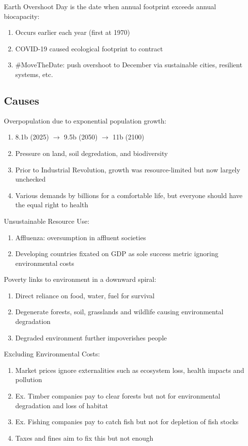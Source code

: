 \documentclass[12pt, a4paper]{article}
\begin{document}
\begin{multicols*}{3}
Earth Overshoot Day is the date when annual footprint exceeds annual biocapacity:
\begin{enumerate}[\roman*.]
  \item Occurs earlier each year (first at 1970)
  \item COVID-19 caused ecological footprint to contract
  \item \#MoveTheDate: push overshoot to December via sustainable cities, resilient systems, etc.
\end{enumerate}
\vspace{-1em}
\colbreak
\subsection{Causes}
Overpopulation due to exponential population growth:
\begin{enumerate}[\roman*.]
  \item 8.1b (2025) $\rightarrow$ 9.5b (2050) $\rightarrow$ 11b (2100) 
  \item Pressure on land, soil degredation, and biodiversity 
  \item Prior to Industrial Revolution, growth was resource-limited but now largely unchecked 
  \item Various demands by billions for a comfortable life, but everyone should have the equal right to health 
\end{enumerate}

Unsustainable Resource Use:
\begin{enumerate}[\roman*.]
  \item Affluenza: oversumption in affluent societies
  \item Developing countries fixated on GDP as sole success metric ignoring environmental costs
\end{enumerate}

Poverty links to environment in a downward spiral:
\begin{enumerate}[\roman*.]
  \item Direct reliance on food, water, fuel for survival
  \item Degenerate forests, soil, grasslands and wildlife causing environmental degradation
  \item Degraded environment further impoverishes people
\end{enumerate}

Excluding Environmental Costs:
\begin{enumerate}[\roman*.]
  \item Market prices ignore externalities such as ecosystem loss, health impacts and pollution 
  \item Ex. Timber companies pay to clear forests but not for environmental degradation and loss of habitat 
  \item Ex. Fishing companies pay to catch fish but not for depletion of fish stocks 
  \item Taxes and fines aim to fix this but not enough
\end{enumerate}


\end{multicols*}
\end{document}
